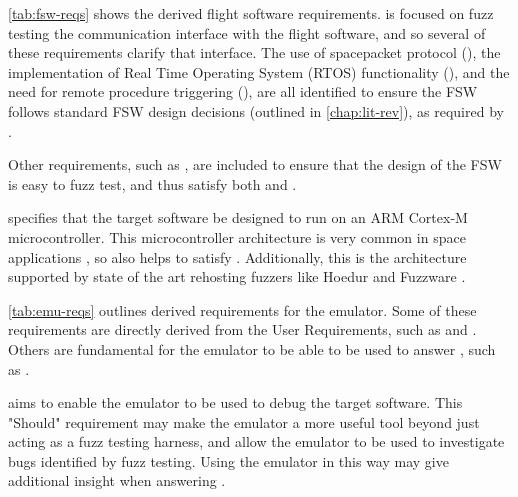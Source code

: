 \documentclass[../report.tex]{subfiles}
\begin{document}
\autoref{tab:fsw-reqs} shows the derived flight software requirements.
 is focused on fuzz testing the communication interface with the
flight software, and so several of these requirements clarify that interface.
The use of spacepacket protocol (), the implementation of Real
Time Operating System (RTOS) functionality (), and the need for
remote procedure triggering (), are all identified to ensure the
FSW follows standard FSW design decisions (outlined in \autoref{chap:lit-rev}),
as required by .

Other requirements, such as , are included to ensure that the
design of the FSW is easy to fuzz test, and thus satisfy both  and
.

 specifies that the target software be designed to run on an ARM
Cortex-M microcontroller. This microcontroller architecture is very common in
space applications \citep{Cratere_2024}, so also helps to satisfy
. Additionally, this is the architecture supported by state of
the art rehosting fuzzers like Hoedur and Fuzzware \citep{Hoedur_2023,
Fuzzware_2022}.

\autoref{tab:emu-reqs} outlines derived requirements for the emulator. Some of
these requirements are directly derived from the User Requirements, such as
 and . Others are fundamental for the emulator to
be able to be used to answer , such as .

 aims to enable the emulator to be used to debug the target
software. This "Should" requirement may make the emulator a more useful tool
beyond just acting as a fuzz testing harness, and allow the emulator to be used
to investigate bugs identified by fuzz testing. Using the emulator in this way
may give additional insight when answering .
\end{document}
